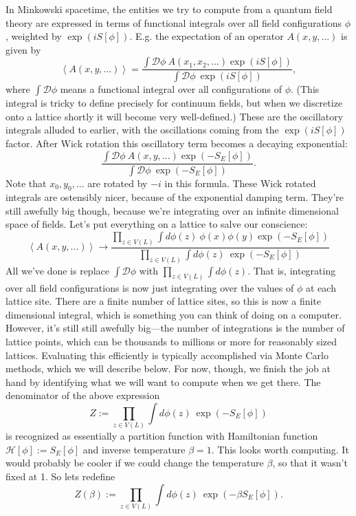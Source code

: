 \documentclass[9pt,twocolumn,twoside]{article}
\begin{document}
In Minkowski spacetime, the entities we try to compute from a quantum field theory are expressed in terms of functional integrals over all field configurations $\phi$, weighted by $\exp(i S[\phi])$.  E.g. the expectation of an operator $A(x,y,...)$ is given by
\[\left<A(x,y,...)\right> = \frac{\int \mathcal{D}\phi \: A(x_1,x_2,...) \exp(i S[\phi])}{\int \mathcal{D}\phi \: \exp(i S[\phi])}, \]
where $\int \mathcal{D}\phi$ means a functional integral over all configurations of $\phi$.  (This integral is tricky to define precisely for continuum fields, but when we discretize onto a lattice shortly it will become very well-defined.)  These are the oscillatory integrals alluded to earlier, with the oscillations coming from the $\exp(i S[\phi])$ factor.  After Wick rotation this oscillatory term becomes a decaying exponential:
\[\frac{\int \mathcal{D}\phi \: A(x,y,...) \exp(-S_E[\phi])}{\int \mathcal{D}\phi \: \exp(-S_E[\phi])}.\]
Note that $x_0,y_0,...$ are rotated by $-i$ in this formula.  These Wick rotated integrals are ostensibly nicer, because of the exponential damping term.  They're still awefully big though, because we're integrating over an infinite dimensional space of fields.  Let's put everything on a lattice to salve our conscience:
\[ \left<A(x,y,...)\right> \rightarrow \frac{\prod_{z\in V(L)}\int d\phi(z) \: \phi(x)\phi(y) \exp(-S_E[\phi])}{\prod_{z\in V(L)}\int d\phi(z) \: \exp(-S_E[\phi])}\]
All we've done is replace $\int \mathcal{D}\phi$ with $\prod_{z\in V(L)}\int d\phi(z)$.  That is, integrating over all field configurations is now just integrating over the values of $\phi$ at each lattice site.  There are a finite number of lattice sites, so this is now a finite dimensional integral, which is something you can think of doing on a computer.  However, it's still still awefully big---the number of integrations is the number of lattice points, which can be thousands to millions or more for reasonably sized lattices.  Evaluating this efficiently is typically accomplished via Monte Carlo methods, which we will describe below.  For now, though, we finish the job at hand by identifying what we will want to compute when we get there.  The denominator of the above expression
\[Z := \prod_{z\in V(L)}\int d\phi(z) \: \exp(-S_E[\phi])\]
is recognized as essentially a partition function with Hamiltonian function $\mathcal{H}[\phi] := S_E[\phi]$ and inverse temperature $\beta=1$.  This looks worth computing.  It would probably be cooler if we could change the temperature $\beta$, so that it wasn't fixed at 1.  So lets redefine
\[Z(\beta) := \prod_{z\in V(L)}\int d\phi(z) \: \exp(-\beta S_E[\phi]).\]
\end{document}
